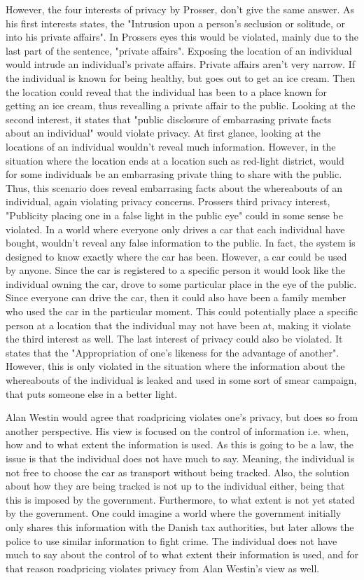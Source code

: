 However, the four interests of privacy by Prosser, don't give the same answer. 
As his first interests states, the "Intrusion upon a person's seclusion or solitude, or into his private affairs". In Prossers eyes this would be violated, mainly due to the last part of the sentence, "private affairs". Exposing the location of an individual would intrude an individual's private affairs. Private affairs aren't very narrow. If the individual is known for being healthy, but goes out to get an ice cream. Then the location could reveal that the individual has been to a place known for getting an ice cream, thus revealling a private affair to the public.  
Looking at the second interest, it states that "public disclosure of embarrasing private facts about an individual" would violate privacy. At first glance, looking at the locations of an individual wouldn't reveal much information. However, in the situation where the location ends at a location such as red-light district, would for some individuals be an embarrasing private thing to share with the public. Thus, this scenario does reveal embarrasing facts about the whereabouts of an individual, again violating privacy concerns. Prossers third privacy interest, "Publicity placing one in a false light in the public eye" could in some sense be violated. In a world where everyone only drives a car that each individual have bought, wouldn't reveal any false information to the public. In fact, the system is designed to know exactly where the car has been. However, a car could be used by anyone. Since the car is registered to a specific person it would look like the individual owning the car, drove to some particular place in the eye of the public. Since everyone can drive the car, then it could also have been a family member who used the car in the particular moment. This could potentially place a specific person at a location that the individual may not have been at, making it violate the third interest as well. 
The last interest of privacy could also be violated. It states that the "Appropriation of one's likeness for the advantage of another". However, this is only violated in the situation where the information about the whereabouts of the individual is leaked and used in some sort of smear campaign, that puts someone else in a better light.  

Alan Westin would agree that roadpricing violates one's privacy, but does so from another perspective. His view is focused on the control of information i.e. when, how and to what extent the information is used. As this is going to be a law, the issue is that the individual does not have much to say. Meaning, the individual is not free to choose the car as transport without being tracked. Also, the solution about how they are being tracked is not up to the individual either, being that this is imposed by the government. Furthermore, to what extent is not yet stated by the government. One could imagine a world where the government initially only shares this information with the Danish tax authorities, but later allows the police to use similar information to fight crime. The individual does not have much to say about the control of to what extent their information is used, and for that reason roadpricing violates privacy from Alan Westin's view as well.  

